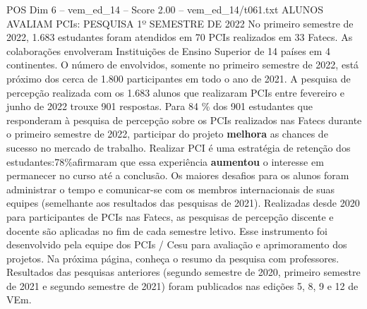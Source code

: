 \begin{textsample}{POS Dim 6 – vem\_ed\_14 – Score 2.00 – vem\_ed\_14/t061.txt}  \label{ex:f6_pos_088}
ALUNOS AVALIAM PCIs: PESQUISA 1º SEMESTRE DE 2022 No primeiro semestre de 2022, 1.683 estudantes foram atendidos em 70 PCIs realizados em 33 Fatecs.
As colaborações envolveram Instituições de Ensino Superior de 14 países em 4 continentes.
O número de envolvidos, somente no primeiro semestre de 2022, está próximo dos cerca de 1.800 participantes em todo o ano de 2021.
A pesquisa de percepção realizada com os 1.683 alunos que realizaram PCIs entre fevereiro e junho de 2022 trouxe 901 respostas.
Para 84 \% dos 901 estudantes que responderam à pesquisa de percepção sobre os PCIs realizados nas Fatecs durante o primeiro semestre de 2022, participar do projeto \textbf{melhora} as chances de sucesso no mercado de trabalho.
Realizar PCI é uma estratégia de retenção dos estudantes:78\%afirmaram que essa experiência \textbf{aumentou} o interesse em permanecer no curso até a conclusão.
Os maiores desafios para os alunos foram administrar o tempo e comunicar-se com os membros internacionais de suas equipes (semelhante aos resultados das pesquisas de 2021).
Realizadas desde 2020 para participantes de PCIs nas Fatecs, as pesquisas de percepção discente e docente são aplicadas no fim de cada semestre letivo.
Esse instrumento foi desenvolvido pela equipe dos PCIs / Cesu para avaliação e aprimoramento dos projetos.
Na próxima página, conheça o resumo da pesquisa com professores.
Resultados das pesquisas anteriores (segundo semestre de 2020, primeiro semestre de 2021 e segundo semestre de 2021) foram publicados nas edições 5, 8, 9 e 12 de VEm.

\end{textsample}
